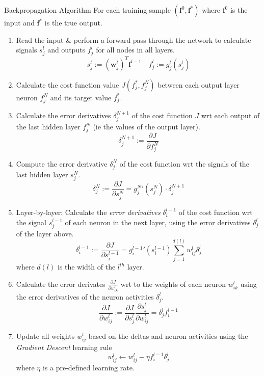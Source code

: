 \documentclass[11pt,a4paper]{article}
\begin{document}
  \begin{proposition}{Backpropagation Algorithm}
    For each training sample $(\mathbf{f}^0,\mathbf{f}^*)$ where $\mathbf{f}^0$ is the input and $\mathbf{f}^*$ is the true output.
    \begin{enumerate}
      \item Read the input \& perform a forward pass through the network to calculate signals $s_j^l$ and outputs $f_j^l$ for all nodes in all layers.
      \[  s_j^l:=(\mathbf{w}_j^l)^T\mathbf{f}^{l-1}\quad f_j^l:=g_j^l(s_j^l) \]

      \item Calculate the cost function value $J(f_j^*,f_j^N)$ between each output layer neuron $f_j^N$ and its target value $f_j^*$.

      \item Calculate the error derivatives $\delta_j^{N+1}$ of the cost function $J$ wrt each output of the last hidden layer $f_j^N$ (ie the values of the output layer).
      \[ \delta_j^{N+1}:=\frac{\partial J}{\partial f_j^N} \]

      \item Compute the error derivative $\delta_j^N$ of the cost function wrt the signals of the last hidden layer $s_j^N$.
      \[ \delta_j^N:=\frac{\partial J}{\partial s_j^N}={g_j^N}'(s_j^N)\cdot\delta_j^{N+1} \]

      \item Layer-by-layer: Calculate the \textit{error derivatives} $\delta_i^{l-1}$ of the cost function wrt the signal $s_j^{l-1}$  of each neuron in the next layer, using the error derivatives $\delta_j^l$ of the layer above.
      \[ \delta_i^{l-1}:=\frac{\partial J}{\partial s_i^{l-1}}={g_i^{l-1}}'(s_i^{l-1})\sum_{j=1}^{d(l)}w_{ij}^l\delta_j^l \]
      where $d(l)$ is the width of the $l^{th}$ layer.

      \item Calculate the error derivates $\frac{\partial J}{\partial w_{ik}^l}$ wrt to the weights of each neuron $w_{ik}^l$ using the error derivatives of the neuron activities $\delta_j^l$.
      \[ \frac{\partial J}{\partial w_{ij}^l}:=\frac{\partial J}{\partial s_j^l}\frac{\partial s_j^l}{\partial w_{ij}^l}=\delta_j^lf_i^{l-1} \]

      \item Update all weights $w_{ij}^l$ based on the deltas and neuron activities using the \textit{Gradient Descent} learning rule
      \[ w_{ij}^l\leftarrow w_{ij}^l-\eta f_i^{l-1}\delta_j^l\]
      where $\eta$ is a pre-defined learning rate.
    \end{enumerate}
  \end{proposition}
\end{document}
